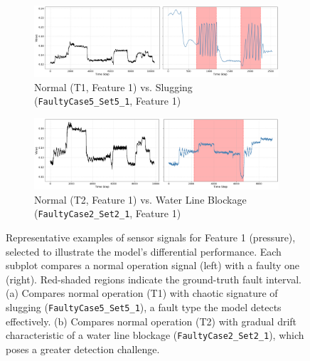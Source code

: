 \documentclass{article}
\begin{document}
\begin{figure}[h!]
    \centering
    \begin{subfigure}[b]{0.95\linewidth}
        \centering
        \includegraphics[width=\linewidth]{figures/comparison_F1_T1_vs_FaultyCase5_Set5_1.png}
        \caption{Normal (T1, Feature 1) vs. Slugging (\texttt{FaultyCase5\_Set5\_1}, Feature 1)}\label{fig:comp_5_5_1}
    \end{subfigure}
    \vspace{1em}
    \begin{subfigure}[b]{0.95\linewidth}
        \centering
        \includegraphics[width=\linewidth]{figures/comparison_F1_T2_vs_FaultyCase2_Set2_1.png}
        \caption{Normal (T2, Feature 1) vs. Water Line Blockage (\texttt{FaultyCase2\_Set2\_1}, Feature 1)}\label{fig:comp_2_2_1}
    \end{subfigure}
    \caption{Representative examples of sensor signals for Feature 1 (pressure), selected to illustrate the model's differential performance. Each subplot compares a normal operation signal (left) with a faulty one (right). Red-shaded regions indicate the ground-truth fault interval. (a) Compares normal operation (T1) with chaotic signature of slugging (\texttt{FaultyCase5\_Set5\_1}), a fault type the model detects effectively. (b) Compares normal operation (T2) with gradual drift characteristic of a water line blockage (\texttt{FaultyCase2\_Set2\_1}), which poses a greater detection challenge.}\label{fig:comparison_signals}
\end{figure}
\end{document}

